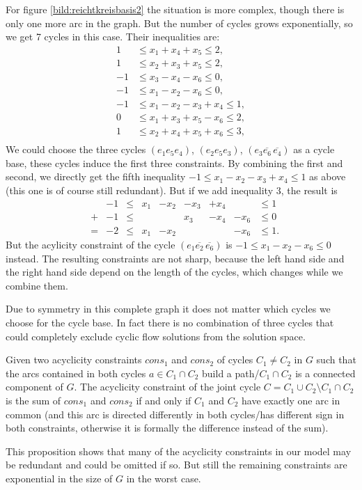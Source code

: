 For figure \ref{bild:reichtkreisbasis2} the situation is more complex, though there is only one more arc in the graph. 
But the number of cycles grows exponentially, so we get 7 cycles in this case. Their inequalities are:
\begin{align*}
 1 &\le x_1+x_4+x_5\le 2,\\
 1&\le x_2+x_3+x_5\le 2 ,\\%
 -1&\le x_3-x_4-x_6\le 0,\\
 -1&\le x_1-x_2-x_6\le 0,\\ 
 -1 &\le x_1-x_2-x_3+x_4 \le 1,\\
 0 &\le x_1+x_3+x_5-x_6\le 2,\\
 1&\le x_2+x_4+x_5+x_6\le 3,\\
\end{align*}
We could choose the three cycles $(e_1 e_5 e_4)$, $(e_2 e_5 e_3)$, $(e_3 \overline{e_6}\, \overline{e_4})$ as a cycle 
base, these cycles induce the first three constraints. By combining the first and second, we directly get the fifth 
inequality $-1 \le x_1-x_2-x_3+x_4 \le 1$ as above (this one is of course still redundant). But if we add inequality 
$3$, the result is 
\begin{align*}
 &&-1 &\le &x_1&-x_2&-x_3&+x_4 &&\le 1\\
 &+&-1&\le &&&x_3&-x_4&-x_6&\le 0\\
 &=&-2&\le&x_1&-x_2&&&-x_6&\le 1.
\end{align*}
But the acylicity constraint of the cycle $(e_1 \overline{e_2} \,\overline{e_6})$ is $-1\le x_1-x_2-x_6\le 0$ instead. 
The resulting constraints are not sharp, because the left hand side and the right hand side depend on the length of the 
cycles, which changes while we combine them.

Due to symmetry in this complete graph it does not matter which cycles we choose for the cycle base. In fact there is 
no combination of three cycles that could completely exclude cyclic flow solutions from the solution space.

\begin{prop}
\label{prop:redundantAcyclicityCons}
 Given two acyclicity constraints $cons_1$ and $cons_2$ of cycles $C_1 \neq C_2$ in $G$ such that the arcs 
contained in both cycles $a\in C_1\cap C_2$ build a path/$C_1\cap C_2$ is a connected component of $G$. 
The acyclicity constraint of the joint cycle $C=C_1\cup C_2 \setminus C_1\cap C_2$
is the sum of $cons_1$ and $cons_2$ if and only if $C_1$ and $C_2$ have exactly one arc in common (and this arc is 
directed differently in both cycles/has different sign in both constraints, otherwise it is formally the difference 
instead of the sum).
\end{prop}
This proposition shows that many of the acyclicity constraints in our model may be redundant and could be omitted if 
so. But still the remaining constraints are exponential in the size of $G$ in the worst case.


